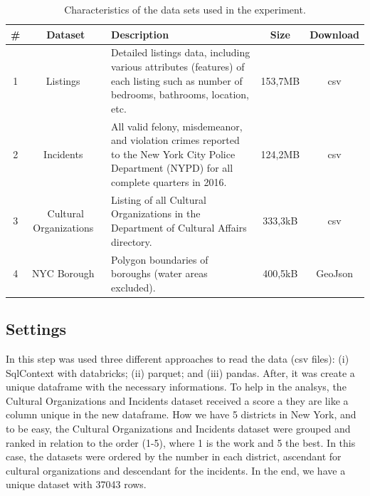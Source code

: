 \documentclass[sigconf]{acmart}
\begin{document}
\begin{table}[!htpb]
	\fontsize{9pt}{9pt}\selectfont
	\centering
	\caption{Characteristics of the data sets used in the experiment.}
	\label{tab:datasets}
	\begin{tabular}{ccp{10cm}cc}
		\toprule
		\textbf{\#} &              \textbf{Dataset}               & \textbf{Description}                                                                                                                          & \textbf{Size} & \textbf{Download} \\ \midrule
		     1      &         Listings~\cite{base:airbnb}         & Detailed listings data, including various attributes (features) of each listing such as number of bedrooms, bathrooms, location, etc.         &    153,7MB    &        csv        \\ \midrule
		     2      &       Incidents~\cite{base:incidents}       & All valid felony, misdemeanor, and violation crimes reported to the New York City Police Department (NYPD) for all complete quarters in 2016. &    124,2MB    &        csv        \\ \midrule
		     3      & Cultural Organizations~\cite{base:cultural} & Listing of all Cultural Organizations in the Department of Cultural Affairs directory.                                                        &    333,3kB    &        csv        \\ \midrule
		     4      &       NYC Borough~\cite{base:borough}       & Polygon boundaries of boroughs (water areas excluded).                                                                                        &    400,5kB    &      GeoJson      \\ \bottomrule
	\end{tabular}
\end{table}

\vspace{-0.2cm}
\subsection{Settings}

In this step was used three different approaches to read the data (csv files): (i) SqlContext with databricks; (ii) parquet; and (iii) pandas. After, it was create a unique dataframe with the necessary informations. To help in the analsys, the Cultural Organizations and Incidents dataset received a score a they are like a column unique in the new dataframe. How we have 5 districts in New York, and to be easy, the Cultural Organizations and Incidents dataset were grouped and ranked in relation to the order (1-5), where 1 is the work and 5 the best. In this case, the datasets were ordered by the number in each district, ascendant for cultural organizations and descendant for the incidents. In the end, we have a unique dataset with 37043 rows.
\end{document}
